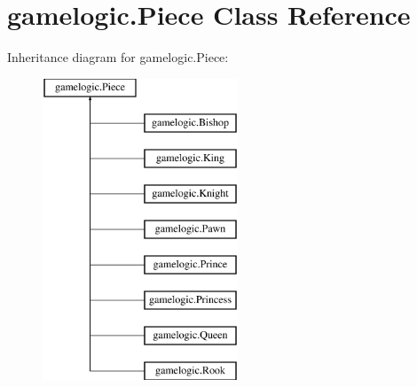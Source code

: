 \hypertarget{classgamelogic_1_1_piece}{}\section{gamelogic.\+Piece Class Reference}
\label{classgamelogic_1_1_piece}
Inheritance diagram for gamelogic.\+Piece\+:\begin{figure}[H]
\begin{center}
\leavevmode
\includegraphics[height=9.000000cm]{classgamelogic_1_1_piece}
\end{center}
\end{figure}
